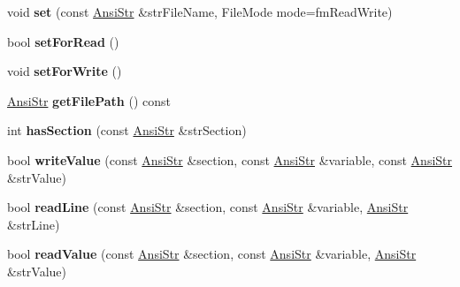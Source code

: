 \begin{DoxyCompactItemize}
\item 
\hypertarget{classps_1_1utils_1_1IniFile_ae8fb149fa22d610954c46ca66904b6a5}{}void {\bfseries set} (const \hyperlink{classps_1_1base_1_1CAString}{Ansi\+Str} \&str\+File\+Name, File\+Mode mode=fm\+Read\+Write)\label{classps_1_1utils_1_1IniFile_ae8fb149fa22d610954c46ca66904b6a5}

\item 
\hypertarget{classps_1_1utils_1_1IniFile_a8205bc39dae3c81eef8d8ecd6415c341}{}bool {\bfseries set\+For\+Read} ()\label{classps_1_1utils_1_1IniFile_a8205bc39dae3c81eef8d8ecd6415c341}

\item 
\hypertarget{classps_1_1utils_1_1IniFile_aa9878c7a066bbde67e7b7d81d9de1188}{}void {\bfseries set\+For\+Write} ()\label{classps_1_1utils_1_1IniFile_aa9878c7a066bbde67e7b7d81d9de1188}

\item 
\hypertarget{classps_1_1utils_1_1IniFile_a769059b86ee86ab853270f9b20c37662}{}\hyperlink{classps_1_1base_1_1CAString}{Ansi\+Str} {\bfseries get\+File\+Path} () const \label{classps_1_1utils_1_1IniFile_a769059b86ee86ab853270f9b20c37662}

\item 
\hypertarget{classps_1_1utils_1_1IniFile_a04e55cb072e34470192bd84112308778}{}int {\bfseries has\+Section} (const \hyperlink{classps_1_1base_1_1CAString}{Ansi\+Str} \&str\+Section)\label{classps_1_1utils_1_1IniFile_a04e55cb072e34470192bd84112308778}

\item 
\hypertarget{classps_1_1utils_1_1IniFile_ab4b96643273bbd43814514df6c3cb716}{}bool {\bfseries write\+Value} (const \hyperlink{classps_1_1base_1_1CAString}{Ansi\+Str} \&section, const \hyperlink{classps_1_1base_1_1CAString}{Ansi\+Str} \&variable, const \hyperlink{classps_1_1base_1_1CAString}{Ansi\+Str} \&str\+Value)\label{classps_1_1utils_1_1IniFile_ab4b96643273bbd43814514df6c3cb716}

\item 
\hypertarget{classps_1_1utils_1_1IniFile_ac1f7d9eeabf23affb0a596b332313aee}{}bool {\bfseries read\+Line} (const \hyperlink{classps_1_1base_1_1CAString}{Ansi\+Str} \&section, const \hyperlink{classps_1_1base_1_1CAString}{Ansi\+Str} \&variable, \hyperlink{classps_1_1base_1_1CAString}{Ansi\+Str} \&str\+Line)\label{classps_1_1utils_1_1IniFile_ac1f7d9eeabf23affb0a596b332313aee}

\item 
\hypertarget{classps_1_1utils_1_1IniFile_a6be2b512881ff9957daf3743a2801d86}{}bool {\bfseries read\+Value} (const \hyperlink{classps_1_1base_1_1CAString}{Ansi\+Str} \&section, const \hyperlink{classps_1_1base_1_1CAString}{Ansi\+Str} \&variable, \hyperlink{classps_1_1base_1_1CAString}{Ansi\+Str} \&str\+Value)\label{classps_1_1utils_1_1IniFile_a6be2b512881ff9957daf3743a2801d86}


\end{DoxyCompactItemize}

